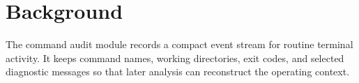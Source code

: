 \section{Background}
\label{sec:background}

The command audit module records a compact event stream for routine terminal activity. It keeps command names, working directories, exit codes, and selected diagnostic messages so that later analysis can reconstruct the operating context.

